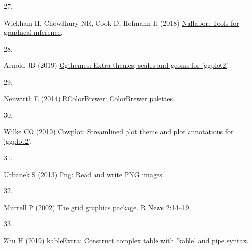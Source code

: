 \documentclass[
]{article}
\newlength{\cslhangindent}
\newlength{\csllabelwidth}
\newenvironment{CSLReferences}[2] %
 {\begin{list}{}{%
  \setlength{\itemindent}{0pt}
  \setlength{\leftmargin}{0pt}
  \setlength{\parsep}{0pt}
  \ifodd #1
   \setlength{\leftmargin}{\cslhangindent}
   \setlength{\itemindent}{-1\cslhangindent}
  \fi
  \setlength{\itemsep}{#2\baselineskip}}}
 {\end{list}}
\newcommand{\CSLLeftMargin}[1]{\parbox[t]{\csllabelwidth}{\strut#1\strut}}
\newcommand{\CSLRightInline}[1]{\parbox[t]{\linewidth - \csllabelwidth}{\strut#1\strut}}
\begin{document}
\begin{CSLReferences}{0}{1}
\CSLLeftMargin{27. }%
\CSLRightInline{Wickham H, Chowdhury NR, Cook D, Hofmann H (2018)
\href{https://CRAN.R-project.org/package=nullabor}{Nullabor: Tools for
graphical inference}. }

\CSLLeftMargin{28. }%
\CSLRightInline{Arnold JB (2019)
\href{https://CRAN.R-project.org/package=ggthemes}{Ggthemes: Extra
themes, scales and geoms for 'ggplot2'}. }

\CSLLeftMargin{29. }%
\CSLRightInline{Neuwirth E (2014)
\href{https://CRAN.R-project.org/package=RColorBrewer}{RColorBrewer:
ColorBrewer palettes}. }

\CSLLeftMargin{30. }%
\CSLRightInline{Wilke CO (2019)
\href{https://CRAN.R-project.org/package=cowplot}{Cowplot: Streamlined
plot theme and plot annotations for 'ggplot2'}. }

\CSLLeftMargin{31. }%
\CSLRightInline{Urbanek S (2013)
\href{https://CRAN.R-project.org/package=png}{Png: Read and write PNG
images}. }

\CSLLeftMargin{32. }%
\CSLRightInline{Murrell P (2002) The grid graphics package. R News
2:14--19}

\CSLLeftMargin{33. }%
\CSLRightInline{Zhu H (2019)
\href{https://CRAN.R-project.org/package=kableExtra}{kableExtra:
Construct complex table with 'kable' and pipe syntax}. }

\end{CSLReferences}
\end{document}
